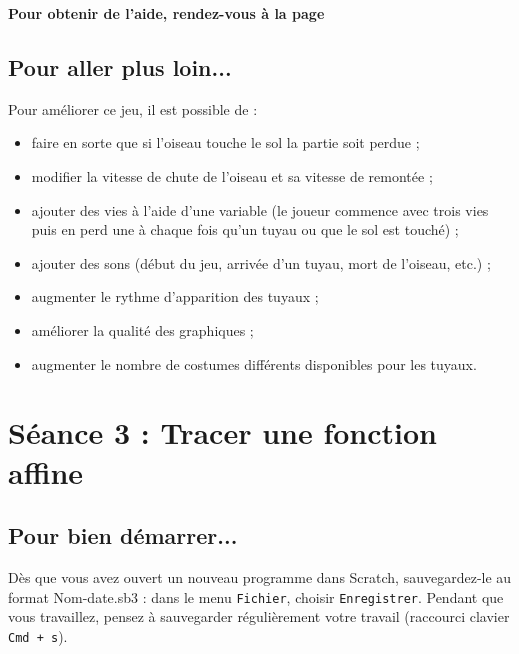 \textbf{Pour obtenir de l'aide, rendez-vous à la page \pageref{aide_seanceScratch2}}



\subsection{Pour aller plus loin...}

Pour améliorer ce jeu, il est possible de :

\begin{itemize}
\item faire en sorte que si l'oiseau touche le sol la partie soit perdue ;
\item modifier la vitesse de chute de l'oiseau et sa vitesse de remontée ; 
\item ajouter des vies à l'aide d'une variable (le joueur commence avec trois vies puis en perd une à chaque fois qu'un tuyau ou que le sol est touché) ;
\item ajouter des sons (début du jeu, arrivée d'un tuyau, mort de l'oiseau, etc.) ;
\item augmenter le rythme d'apparition des tuyaux ; 
\item améliorer la qualité des graphiques ;
\item augmenter le nombre de costumes différents disponibles pour les tuyaux. 
\end{itemize}







%
%
%
%

\newpage

\section{Séance 3 : Tracer une fonction affine}\label{ficheScratch4e3}

\subsection{Pour bien démarrer...}

Dès que vous avez ouvert un nouveau programme dans Scratch, sauvegardez-le au format Nom-date.sb3 : dans le menu \texttt{Fichier}, choisir \texttt{Enregistrer}. Pendant que vous travaillez, pensez à sauvegarder régulièrement votre travail (raccourci clavier \texttt{Cmd + s}).   


